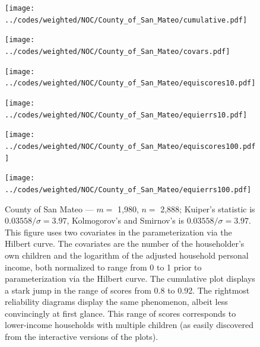 \documentclass[]{fairmeta}
\begin{document}
\begin{figure}
\begin{centering}

\parbox{\imsize}{\texttt{[image: ../codes/weighted/NOC/County\_of\_San\_Mateo/cumulative.pdf]}}
\quad\quad
\parbox{\imsize}{\texttt{[image: ../codes/weighted/NOC/County\_of\_San\_Mateo/covars.pdf]}}

\vspace{\vertsep}

\parbox{\imsize}{\texttt{[image: ../codes/weighted/NOC/County\_of\_San\_Mateo/equiscores10.pdf]}}
\quad\quad
\parbox{\imsize}{\texttt{[image: ../codes/weighted/NOC/County\_of\_San\_Mateo/equierrs10.pdf]}}

\vspace{\vertsep}

\parbox{\imsize}{\texttt{[image: ../codes/weighted/NOC/County\_of\_San\_Mateo/equiscores100.pdf]}}
\quad\quad
\parbox{\imsize}{\texttt{[image: ../codes/weighted/NOC/County\_of\_San\_Mateo/equierrs100.pdf]}}

\end{centering}
\caption{County of San Mateo --- $m =$ 1,980, $n =$ 2,888;
         Kuiper's statistic is $0.03558 / \sigma = 3.97$,
         Kolmogorov's and Smirnov's is $0.03558 / \sigma = 3.97$.
         This figure uses two covariates in the parameterization
         via the Hilbert curve. The covariates are the number
         of the householder's own children and the logarithm
         of the adjusted household personal income, both normalized
         to range from 0 to 1 prior to parameterization via the Hilbert curve.
         The cumulative plot displays a stark jump in the range of scores
         from 0.8 to 0.92. The rightmost reliability diagrams
         display the same phenomenon, albeit less convincingly at first glance.
         This range of scores corresponds to lower-income households
         with multiple children (as easily discovered
         from the interactive versions of the plots).
}
\label{san_mateo}
\end{figure}
\end{document}
